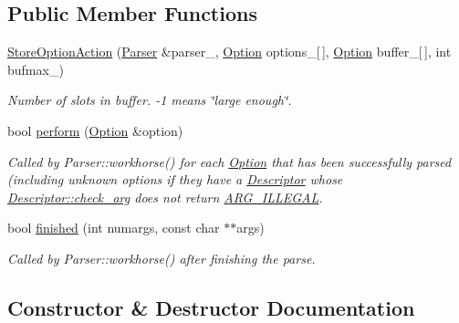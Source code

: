 \subsection*{Public Member Functions}
\begin{DoxyCompactItemize}
\item 
\hyperlink{classoption_1_1Parser_1_1StoreOptionAction_aaa638cdd712202e3e10471d4299f7f9d}{Store\+Option\+Action} (\hyperlink{classoption_1_1Parser}{Parser} \&parser\+\_\+, \hyperlink{classoption_1_1Option}{Option} options\+\_\+\mbox{[}$\,$\mbox{]}, \hyperlink{classoption_1_1Option}{Option} buffer\+\_\+\mbox{[}$\,$\mbox{]}, int bufmax\+\_\+)
\begin{DoxyCompactList}\small\item\em Number of slots in {\ttfamily buffer}. {\ttfamily -\/1} means \char`\"{}large enough\char`\"{}. \end{DoxyCompactList}\item 
bool \hyperlink{classoption_1_1Parser_1_1StoreOptionAction_a8931919fba5516377c202920db2b2f84}{perform} (\hyperlink{classoption_1_1Option}{Option} \&option)
\begin{DoxyCompactList}\small\item\em Called by Parser\+::workhorse() for each \hyperlink{classoption_1_1Option}{Option} that has been successfully parsed (including unknown options if they have a \hyperlink{structoption_1_1Descriptor}{Descriptor} whose \hyperlink{structoption_1_1Descriptor_aa5d675dba0214a4abd73007ff163cc67}{Descriptor\+::check\+\_\+arg} does not return \hyperlink{namespaceoption_aee8c76a07877335762631491e7a5a1a9a9528e32563b795bd2930b12d0a5e382d}{A\+R\+G\+\_\+\+I\+L\+L\+E\+G\+AL}. \end{DoxyCompactList}\item 
bool \hyperlink{classoption_1_1Parser_1_1StoreOptionAction_a617f675ef50a72ae36ce91f065bc8441}{finished} (int numargs, const char $\ast$$\ast$args)
\begin{DoxyCompactList}\small\item\em Called by Parser\+::workhorse() after finishing the parse. \end{DoxyCompactList}\end{DoxyCompactItemize}


\subsection{Constructor \& Destructor Documentation}
\mbox{\label{classoption_1_1Parser_1_1StoreOptionAction_aaa638cdd712202e3e10471d4299f7f9d}} 
